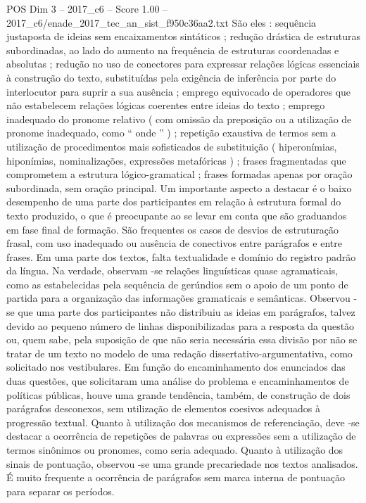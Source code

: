 \begin{textsample}{POS Dim 3 – 2017\_c6 – Score 1.00 – 2017\_c6/enade\_2017\_tec\_an\_sist\_f950c36aa2.txt}
São eles : sequência justaposta de ideias sem encaixamentos sintáticos ; redução drástica de estruturas subordinadas, ao lado do aumento na frequência de estruturas coordenadas e absolutas ; redução no uso de conectores para expressar relações lógicas essenciais à construção do texto, substituídas pela exigência de inferência por parte do interlocutor para suprir a sua ausência ; emprego equivocado de operadores que não estabelecem relações lógicas coerentes entre ideias do texto ; emprego inadequado do pronome relativo ( com omissão da preposição ou a utilização de pronome inadequado, como “ onde ” ) ; repetição exaustiva de termos sem a utilização de procedimentos mais sofisticados de substituição ( hiperonímias, hiponímias, nominalizações, expressões metafóricas ) ; frases fragmentadas que comprometem a estrutura lógico-gramatical ; frases formadas apenas por oração subordinada, sem oração principal.
Um importante aspecto a destacar é o baixo desempenho de uma parte dos participantes em relação à estrutura formal do texto produzido, o que é preocupante ao se levar em conta que são graduandos em fase final de formação.
São frequentes os casos de desvios de estruturação frasal, com uso inadequado ou ausência de conectivos entre parágrafos e entre frases.
Em uma parte dos textos, falta textualidade e domínio do registro padrão da língua.
Na verdade, observam -se relações linguísticas quase agramaticais, como as estabelecidas pela sequência de gerúndios sem o apoio de um ponto de partida para a organização das informações gramaticais e semânticas.
Observou -se que uma parte dos participantes não distribuiu as ideias em parágrafos, talvez devido ao pequeno número de linhas disponibilizadas para a resposta da questão ou, quem sabe, pela suposição de que não seria necessária essa divisão por não se tratar de um texto no modelo de uma redação dissertativo-argumentativa, como solicitado nos vestibulares.
Em função do encaminhamento dos enunciados das duas questões, que solicitaram uma análise do problema e encaminhamentos de políticas públicas, houve uma grande tendência, também, de construção de dois parágrafos desconexos, sem utilização de elementos coesivos adequados à progressão textual.
Quanto à utilização dos mecanismos de referenciação, deve -se destacar a ocorrência de repetições de palavras ou expressões sem a utilização de termos sinônimos ou pronomes, como seria adequado.
Quanto à utilização dos sinais de pontuação, observou -se uma grande precariedade nos textos analisados.
É muito frequente a ocorrência de parágrafos sem marca interna de pontuação para separar os períodos.

\end{textsample}
